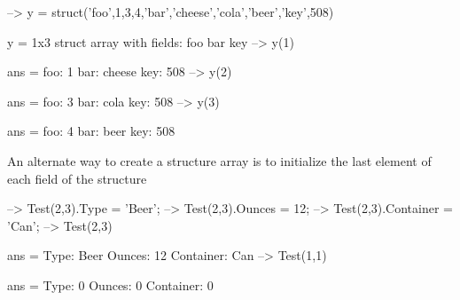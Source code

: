 \begin{DoxyVerbInclude}
--> y = struct('foo',{1,3,4},'bar',{'cheese','cola','beer'},'key',508)

y = 
1x3 struct array with fields:
    foo
    bar
    key
--> y(1)

ans = 
    foo: 1
    bar: cheese
    key: 508
--> y(2)

ans = 
    foo: 3
    bar: cola
    key: 508
--> y(3)

ans = 
    foo: 4
    bar: beer
    key: 508
\end{DoxyVerbInclude}


An alternate way to create a structure array is to initialize the last element of each field of the structure


\begin{DoxyVerbInclude}
--> Test(2,3).Type = 'Beer';
--> Test(2,3).Ounces = 12;
--> Test(2,3).Container = 'Can';
--> Test(2,3)

ans = 
    Type: Beer
    Ounces: 12
    Container: Can
--> Test(1,1)

ans = 
    Type: 0
    Ounces: 0
    Container: 0
\end{DoxyVerbInclude}
 